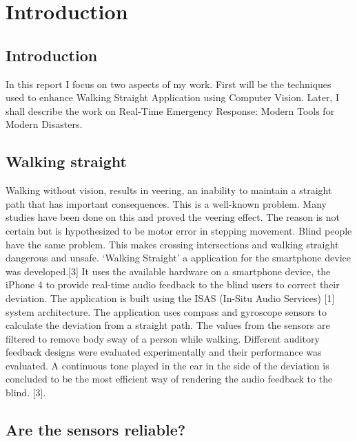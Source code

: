\chapter{Introduction}
\label{chap:intro}

\section{Introduction}

In this report I focus on two aspects of my work. First will be the techniques used to enhance Walking Straight Application using Computer Vision. Later, I shall describe the work on Real-Time Emergency Response: Modern Tools for Modern Disasters.

\section{Walking straight}
\label{sec:xrefs}

Walking without vision, results in veering, an inability to maintain a straight path that has important consequences. This is a well-known problem. Many studies have been done on this and proved the veering effect. The reason is not certain but is hypothesized to be motor error in stepping movement.  Blind people have the same problem. This makes crossing intersections and walking straight dangerous and unsafe.
‘Walking Straight’ a application for the smartphone device was developed.[3] It uses the available hardware on a smartphone device, the iPhone 4 to provide real-time audio feedback to the blind users to correct their deviation. The application is built using the ISAS (In-Situ Audio Services) [1] system architecture. The application uses compass and gyroscope sensors to calculate the deviation from a straight path. The values from the sensors are filtered to remove body sway of a person while walking. Different auditory feedback designs were evaluated experimentally and their performance was evaluated. A continuous tone played in the ear in the side of the deviation is concluded to be the most efficient way of rendering the audio feedback to the blind. [3].

\section{Are the sensors reliable?}

